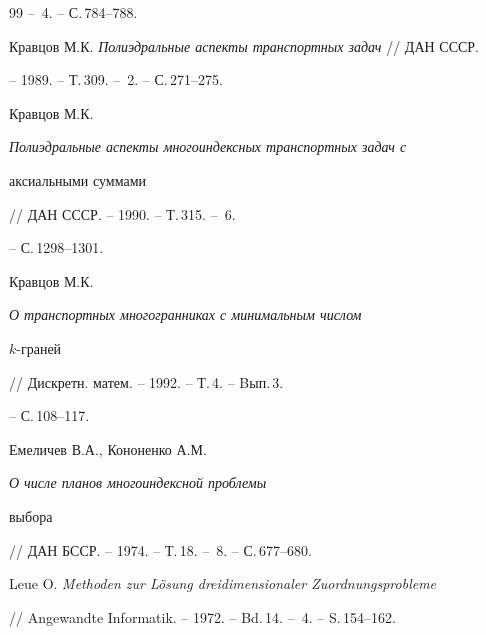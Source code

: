 \begin{thebibliography}{99}
-- \No\,4. -- С.\,784--788.




Кравцов М.К. {\em Полиэдральные аспекты транспортных задач} // ДАН СССР.


-- 1989. -- Т.\,309. -- \No\,2. -- С.\,271--275.




Кравцов М.К. {\em Полиэдральные аспекты многоиндексных транспортных задач с


аксиальными суммами} // ДАН СССР. -- 1990. -- Т.\,315. -- \No\,6.


-- С.\,1298--1301.




Кравцов М.К. {\em О транспортных многогранниках с минимальным числом


$k$-граней} // Дискретн. матем. -- 1992. -- Т.\,4. -- Bып.\,3.


-- С.\,108--117.




Емеличев В.А., Кононенко А.М. {\em О числе планов многоиндексной проблемы


выбора} // ДАН БССР. -- 1974. -- Т.\,18. -- \No\,8. -- С.\,677--680.




Leue O. {\em Methoden zur L\"osung dreidimensionaler Zuordnungsprobleme}


// Angewandte Informatik. -- 1972. -- Bd.\,14. -- \No\,4. -- S.\,154--162.





\end{thebibliography}





\vskip 2cm











\smallskip




\label{end}





